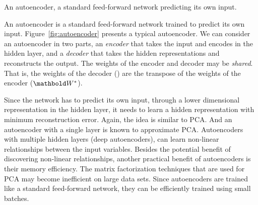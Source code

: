 \begin{marginfigure}
  \centering
      \caption{An autoencoder, a standard feed-forward network predicting its own input.}\label{fig:autoencoder}
\end{marginfigure}
An autoencoder is a standard feed-forward network
trained to predict its own input.
Figure~\ref{fig:autoencoder} presents a typical autoencoder.
We can consider an autoencoder in two parts,
an \emph{encoder} that takes the input and encodes in the hidden layer,
and a \emph{decoder} that takes
the hidden representations and reconstructs the output.%
The weights of the encoder and decoder may be \emph{shared}.
That is, the weights of the decoder () are the transpose of the 
weights of the encoder ($\vect{W}^*$).%

Since the network has to predict its own input,
through a lower dimensional representation in the hidden layer,
it needs to learn a hidden representation with minimum reconstruction error.
Again, the idea is similar to PCA.
And an autoencoder with a single layer is known to approximate PCA.
Autoencoders with multiple hidden layers (deep autoencoders),
can learn non-linear relationships between the input variables.
Besides the potential benefit of discovering non-linear relationships,
another practical benefit of autoencoders is their memory efficiency.
The matrix factorization techniques that are used for PCA
may become inefficient on large data sets.
Since autoencoders are trained like a standard feed-forward network,
they can be efficiently trained using small batches.


